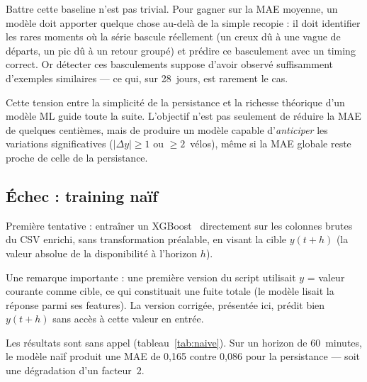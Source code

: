 \documentclass[fleqn, 12pt]{scrartcl}
\begin{document}
Battre cette baseline n'est pas trivial. Pour gagner sur la MAE moyenne, un modèle doit apporter quelque chose au-delà de la simple recopie : il doit identifier les rares moments où la série bascule réellement (un creux dû à une vague de départs, un pic dû à un retour groupé) et prédire ce basculement avec un timing correct. Or détecter ces basculements suppose d'avoir observé suffisamment d'exemples similaires --- ce qui, sur 28~jours, est rarement le cas.

\vspace{0.3cm}

Cette tension entre la simplicité de la persistance et la richesse théorique d'un modèle ML guide toute la suite. L'objectif n'est pas seulement de réduire la MAE de quelques centièmes, mais de produire un modèle capable d'\emph{anticiper} les variations significatives ($|\Delta y| \geq 1$ ou $\geq 2$~vélos), même si la MAE globale reste proche de celle de la persistance.


\subsection{Échec : training naïf}
\label{ssec:naif}


\vspace{0.3cm}

Première tentative : entraîner un XGBoost~\cite{chen_xgboost_2016} directement sur les colonnes brutes du CSV enrichi, sans transformation préalable, en visant la cible $y(t+h)$ (la valeur absolue de la disponibilité à l'horizon $h$).

\vspace{0.3cm}

Une remarque importante : une première version du script utilisait $y$ = valeur courante comme cible, ce qui constituait une fuite totale (le modèle lisait la réponse parmi ses features). La version corrigée, présentée ici, prédit bien $y(t+h)$ sans accès à cette valeur en entrée.

\vspace{0.3cm}

Les résultats sont sans appel (tableau~\ref{tab:naive}). Sur un horizon de 60~minutes, le modèle naïf produit une MAE de 0{,}165 contre 0{,}086 pour la persistance --- soit une dégradation d'un facteur~2.
\end{document}
